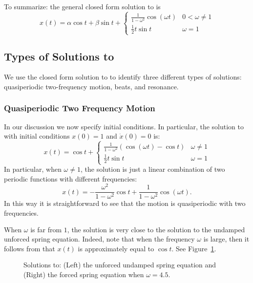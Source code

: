 To summarize: the general closed form solution to  is
\begin{equation}  \label{eq:uspfsoln}
x(t) = \alpha\cos t+\beta\sin t + \left\{\begin{array}{lr}
\frac{1}{1-\omega ^2}\cos(\omega t)  & 0<\omega\neq 1\\  
\frac{1}{2}t\sin t & \omega=1 \end{array}\right.\end{equation}

\subsection*{Types of Solutions to }

We use the closed form solution  to  to
identify three different types of solutions: quasiperiodic two-frequency 
motion, beats, and resonance.

\subsubsection*{Quasiperiodic Two Frequency Motion}

In our discussion we now specify initial conditions.  In particular, the 
solution to  with initial conditions $x(0)=1$ and 
$\dot{x}(0)=0$ is:
\arraystart
\begin{equation}  \label{e:x(t)reson}
x(t) = \cos t + \left\{\begin{array}{ll}
\frac{1}{1-\omega ^2}(\cos(\omega t)-\cos t) & \omega \neq 1 \\
\frac{1}{2}t\sin t & \omega=1  \end{array}\right.
\end{equation}
\arrayfinish
In particular, when $\omega\neq 1$, the solution  is
just a linear combination of two periodic 
functions with different 
frequencies:
\begin{equation} \label{e:x(t)reson2}
x(t) = -\frac{\omega^2}{1-\omega ^2} \cos t + \frac{1}{1-\omega ^2}\cos(\omega t).
\end{equation}
In this way it is straightforward to see that the motion is 
quasiperiodic
with two frequencies.

When $\omega$ is far from $1$, the solution is very close to the solution
to the undamped unforced spring equation.  
Indeed, note that when the frequency
$\omega$ is large, then it follows from  that $x(t)$ is 
approximately equal to $\cos t$.  See Figure~\ref{F:nonreson}.
\begin{figure}[htb]
           \centerline{%
           }
           \caption{Solutions to: (Left) the unforced undamped spring
        equation and (Right) the forced spring equation when $\omega =4.5$.}
           \label{F:nonreson}
\end{figure}

